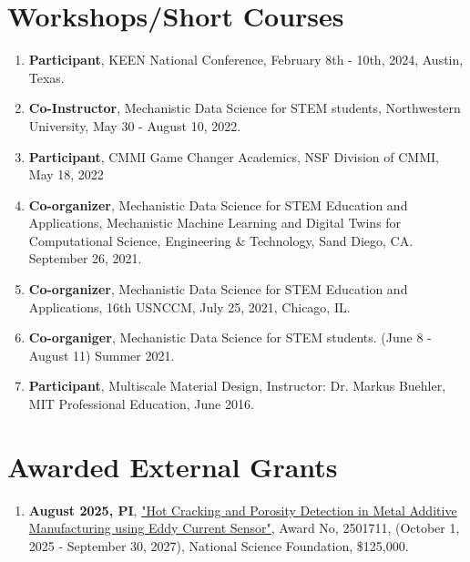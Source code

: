 \documentclass[11pt, letterpaper]{article}
\begin{document}
\section{Workshops/Short Courses}
    \begin{enumerate}[label=\arabic*., itemsep=-1pt, topsep=2pt]
        \item \textbf{Participant}, KEEN National Conference,  February 8th - 10th, 2024, Austin, Texas.
        \item \textbf{Co-Instructor}, Mechanistic Data Science for STEM students, Northwestern University, May 30 - August 10, 2022.
        \item \textbf{Participant}, CMMI Game Changer Academics, NSF Division of CMMI, May 18, 2022
        \item \textbf{Co-organizer}, Mechanistic Data Science for STEM Education and Applications, Mechanistic Machine Learning and Digital Twins for Computational Science, Engineering \& Technology, Sand Diego, CA. September 26, 2021.
        \item \textbf{Co-organizer}, Mechanistic Data Science for STEM Education and Applications, 16th USNCCM, July 25, 2021, Chicago, IL.
        \item \textbf{Co-organiger}, Mechanistic Data Science for STEM students. (June 8 - August 11) Summer 2021. 
        \item \textbf{Participant}, Multiscale Material Design, Instructor: Dr. Markus Buehler, MIT Professional Education, June 2016.
    \end{enumerate}

\section{Awarded External Grants}
    \begin{enumerate}[label=\arabic*., itemsep=-1pt, topsep=2pt]
        \item \textbf{August 2025, PI}, \href{https://www.nsf.gov/awardsearch/show-award?AWD_ID=2501711}{"Hot Cracking and Porosity Detection in Metal Additive Manufacturing using Eddy Current Sensor"}, Award No, 2501711, (October 1, 2025 - September 30, 2027), National Science Foundation, \$125,000.
    \end{enumerate}
\end{document}

